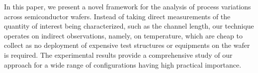 In this paper, we present a novel framework for the analysis of process variations across semiconductor wafers. Instead of taking direct measurements of the quantity of interest being characterized, such as the channel length, our technique operates on indirect observations, namely, on temperature, which are cheap to collect as no deployment of expensive test structures or equipments on the wafer is required.
The experimental results provide a comprehensive study of our approach for a wide range of configurations having high practical importance.
